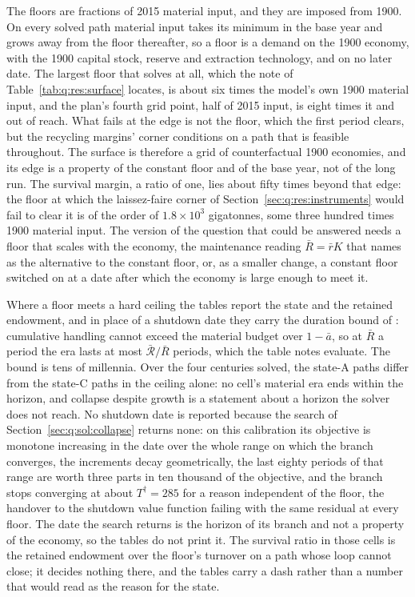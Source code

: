 

 The floors are fractions of 2015 material input, and they are imposed from 1900. On every solved path material input takes its minimum in the base year and grows away from the floor thereafter, so a floor is a demand on the 1900 economy, with the 1900 capital stock, reserve and extraction technology, and on no later date. The largest floor that solves at all, which the note of Table~\ref{tab:q:res:surface} locates, is about six times the model's own 1900 material input, and the plan's fourth grid point, half of 2015 input, is eight times it and out of reach. What fails at the edge is not the floor, which the first period clears, but the recycling margins' corner conditions on a path that is feasible throughout. The surface is therefore a grid of counterfactual 1900 economies, and its edge is a property of the constant floor and of the base year, not of the long run. The survival margin, a ratio of one, lies about fifty times beyond that edge: the floor at which the laissez-faire corner of Section~\ref{sec:q:res:instruments} would fail to clear it is of the order of $1.8\times10^{3}$ gigatonnes, some three hundred times 1900 material input. The version of the question that could be answered needs a floor that scales with the economy, the maintenance reading $\bar R=\bar rK$ that  names as the alternative to the constant floor, or, as a smaller change, a constant floor switched on at a date after which the economy is large enough to meet it.

 Where a floor meets a hard ceiling the tables report the state and the retained endowment, and in place of a shutdown date they carry the duration bound of : cumulative handling cannot exceed the material budget over $1-\bar a$, so at $\bar R$ a period the era lasts at most $\bar{\mathcal R}/\bar R$ periods, which the table notes evaluate. The bound is tens of millennia. Over the four centuries solved, the state-A paths differ from the state-C paths in the ceiling alone: no cell's material era ends within the horizon, and collapse despite growth is a statement about a horizon the solver does not reach. No shutdown date is reported because the search of Section~\ref{sec:q:sol:collapse} returns none: on this calibration its objective is monotone increasing in the date over the whole range on which the branch converges, the increments decay geometrically, the last eighty periods of that range are worth three parts in ten thousand of the objective, and the branch stops converging at about $T^\dagger=285$ for a reason independent of the floor, the handover to the shutdown value function failing with the same residual at every floor. The date the search returns is the horizon of its branch and not a property of the economy, so the tables do not print it. The survival ratio in those cells is the retained endowment over the floor's turnover on a path whose loop cannot close; it decides nothing there, and the tables carry a dash rather than a number that would read as the reason for the state.

